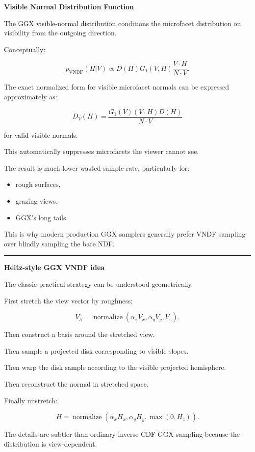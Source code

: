 \textbf{Visible Normal Distribution Function}

The GGX visible-normal distribution conditions the microfacet distribution on visibility from the outgoing direction.

Conceptually:

\[
\boxed{
p_{\text{VNDF}}(H|V)
\propto
D(H)
G_1(V,H)
\frac{
V\cdot H
}{
N\cdot V
}.
}
\]

The exact normalized form for visible microfacet normals can be expressed approximately as:

\[
\boxed{
D_V(H)
=
\frac{
G_1(V)
(V\cdot H)
D(H)
}{
N\cdot V
}
}
\]

for valid visible normals.

This automatically suppresses microfacets the viewer cannot see.

The result is much lower wasted-sample rate, particularly for:

\begin{itemize}
\tightlist
\item
  rough surfaces,
\item
  grazing views,
\item
  GGX's long tails.
\end{itemize}

This is why modern production GGX samplers generally prefer VNDF sampling over blindly sampling the bare NDF.

\begin{center}\rule{0.5\linewidth}{0.5pt}\end{center}

\textbf{Heitz-style GGX VNDF idea}

The classic practical strategy can be understood geometrically.

First stretch the view vector by roughness:

\[
V_h=
\operatorname{normalize}
(
\alpha_xV_x,
\alpha_yV_y,
V_z
).
\]

Then construct a basis around the stretched view.

Then sample a projected disk corresponding to visible slopes.

Then warp the disk sample according to the visible projected hemisphere.

Then reconstruct the normal in stretched space.

Finally unstretch:

\[
H=
\operatorname{normalize}
(
\alpha_xH_x,
\alpha_yH_y,
\max(0,H_z)
).
\]

The details are subtler than ordinary inverse-CDF GGX sampling because the distribution is view-dependent.

